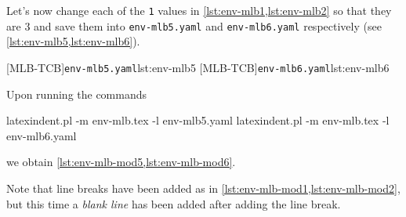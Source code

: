   \begin{example}
  Let's now change each of the \texttt{1} values in \cref{lst:env-mlb1,lst:env-mlb2} so
  that they are $3$ and save them into \texttt{env-mlb5.yaml} and \texttt{env-mlb6.yaml}
  respectively (see \cref{lst:env-mlb5,lst:env-mlb6}). %

  \begin{cmhtcbraster}
   [MLB-TCB]{\texttt{env-mlb5.yaml}}{lst:env-mlb5}
   [MLB-TCB]{\texttt{env-mlb6.yaml}}{lst:env-mlb6}
  \end{cmhtcbraster}

  Upon running the commands

  \begin{commandshell}
latexindent.pl -m env-mlb.tex -l env-mlb5.yaml
latexindent.pl -m env-mlb.tex -l env-mlb6.yaml
\end{commandshell}

  we obtain \cref{lst:env-mlb-mod5,lst:env-mlb-mod6}.

  \begin{widepage}
   \begin{minipage}{.56\linewidth}
   \end{minipage}
   \hfill
   \begin{minipage}{.43\linewidth}
   \end{minipage}
  \end{widepage}

  Note that line breaks have been added as in \cref{lst:env-mlb-mod1,lst:env-mlb-mod2},
  but this time a \emph{blank line} has been added after adding the line break.
  \end{example}

